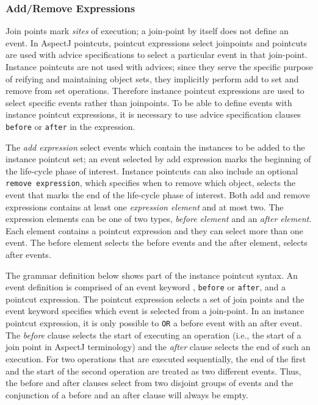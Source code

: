 \documentclass{llncs}
\begin{document}
\subsubsection{Add/Remove Expressions}
Join points mark \emph{sites} of execution; a join-point by itself does not define an event. 
In AspectJ pointcuts, pointcut expressions select joinpoints and pointcuts are used with advice specifications to select a particular event in that join-point.
Instance pointcuts are not used with advices; since they serve the specific purpose of reifying and maintaining object sets, they implicitly perform add to set and remove from set operations. 
Therefore instance pointcut expressions are used to select specific events rather than joinpoints.
To be able to define events with instance pointcut expressions, it is necessary to use advice specification clauses \texttt{before} or \texttt{after} in the expression. 

The \emph{add expression} select events which contain the instances to be added to the instance pointcut set; an event selected by add expression marks the beginning of the life-cycle phase of interest. 
Instance pointcuts can also include an optional \texttt{remove expression},  which specifies when to remove which object, selects the event that marks the end of the life-cycle phase of interest.
Both add and remove expressions contains at least one \emph{expression element} and at most two.
The expression elements can be one of two types, \emph{before element} and an \emph{after element}.
Each element contains a pointcut expression and they can select more than one event. 
The before element selects the before events and the after element, selects after events. 

The grammar definition below shows part of the instance pointcut syntax. 
An event definition is comprised of an event keyword , \texttt{before} or \texttt{after}, and a pointcut expression.
The pointcut expression selects a set of join points and the event keyword specifies which event is selected from a join-point. 
In an instance pointcut expression, it is only possible to \texttt{OR} a before event with an after event. 
The \emph{before} clause selects the start of executing an operation (i.e., the start of a join point in AspectJ terminology) and the \emph{after} clause selects the end of such an execution. 
For two operations that are executed sequentially, the end of the first and the start of the second operation are treated as two different events. Thus, the before and after clauses select from two disjoint groups of events and the conjunction of a before and an after clause will always be empty.
\end{document}
